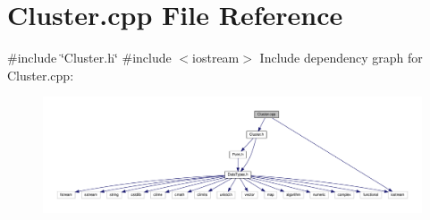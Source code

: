 \section{Cluster.\+cpp File Reference}
\label{_cluster_8cpp}
{\ttfamily \#include \char`\"{}Cluster.\+h\char`\"{}}\newline
{\ttfamily \#include $<$iostream$>$}\newline
Include dependency graph for Cluster.\+cpp\+:
\nopagebreak
\begin{figure}[H]
\begin{center}
\leavevmode
\includegraphics[width=350pt]{_cluster_8cpp__incl}
\end{center}
\end{figure}
